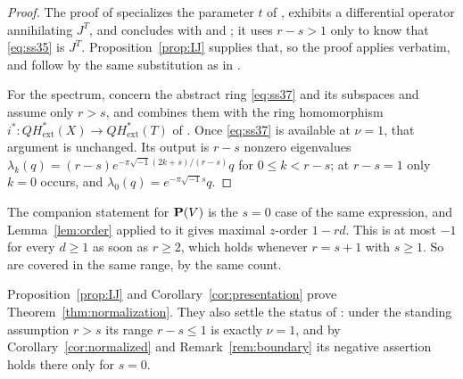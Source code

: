 \begin{proof}
  The proof of \cite[Theorem~4.6]{SS} specializes the parameter \(t\) of
  \cite[Theorem~4.4]{SS}, exhibits a differential operator annihilating
  \(J^{T}\), and concludes with \cite[Theorem~10.3.1]{CoxKatz} and
  \cite[Lemma~2]{Pandharipande}; it uses \(r-s>1\) only to know that
  \eqref{eq:ss35} is \(J^{T}\).  Proposition~\ref{prop:IJ} supplies that,
  so the proof applies verbatim, and \cite[(39)--(40)]{SS} follow by the
  same substitution as in \cite[Section~4.3]{SS}.

  For the spectrum, \cite[Propositions~5.1 and~5.2]{SS} concern the abstract
  ring \eqref{eq:ss37} and its subspaces and assume only \(r>s\), and
  \cite[Corollary~5.3]{SS} combines them with the ring homomorphism
  \(i^{*}\colon QH^{*}_{\mathrm{ext}}(X)\to QH^{*}_{\mathrm{ext}}(T)\) of
  \cite[Theorem~3.3]{SS}.  Once \eqref{eq:ss37} is available at \(\nu=1\),
  that argument is unchanged.  Its output is \(r-s\) nonzero eigenvalues
  \(\lambda_{k}(q)=(r-s)e^{-\pi\sqrt{-1}(2k+s)/(r-s)}q\) for
  \(0\le k<r-s\); at \(r-s=1\) only \(k=0\) occurs, and
  \(\lambda_{0}(q)=e^{-\pi\sqrt{-1}s}q\).
\end{proof}

\begin{remark}
  \label{rem:pbundle}
  The companion statement \cite[(34)]{SS} for \(\mathbf P(V)\) is the \(s=0\) case
  of the same expression, and Lemma~\ref{lem:order} applied to it gives
  maximal \(z\)-order \(1-rd\).  This is at most \(-1\) for every \(d\ge1\)
  as soon as \(r\ge2\), which holds whenever \(r=s+1\) with \(s\ge1\).  So
  \cite[(34), (36) and~(38)]{SS} are covered in the same range, by the same
  count.
\end{remark}

Proposition~\ref{prop:IJ} and Corollary~\ref{cor:presentation} prove
Theorem~\ref{thm:normalization}.  They also settle the status of
\cite[Remark~4.5(3)]{SS}: under the standing assumption \(r>s\) its range
\(r-s\le1\) is exactly \(\nu=1\), and by
Corollary~\ref{cor:normalized} and Remark~\ref{rem:boundary} its negative
assertion holds there only for \(s=0\).
